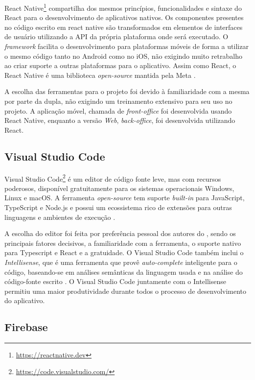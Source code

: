 React Native\footnote{\url{https://reactnative.dev}} compartilha dos mesmos princípios, funcionalidades e sintaxe do React para o desenvolvimento de aplicativos nativos. Os componentes presentes no código escrito em react native são transformados em elementos de interfaces de usuário utilizando a API da própria plataforma onde será executado. O \textit{framework} facilita o desenvolvimento para plataformas móveis de forma a utilizar o mesmo código tanto no Android como no iOS, não exigindo muito retrabalho ao criar suporte a outras plataformas para o aplicativo. Assim como React, o React Native é uma biblioteca \textit{open-source} mantida pela Meta \cite{react-native}.

A escolha das ferramentas para o projeto \appName foi devido à familiaridade com a mesma por parte da dupla, não exigindo um treinamento extensivo para seu uso no projeto. A aplicação móvel, chamada de \textit{front-office} foi desenvolvida usando React Native, enquanto a versão \textit{Web}, \textit{back-office}, foi desenvolvida utilizando React.

\subsection{Visual Studio Code}

Visual Studio Code\footnote{\url{https://code.visualstudio.com/}} é um editor de código fonte leve, mas com recursos poderosos, disponível gratuitamente para os sistemas operacionais Windows, Linux e macOS. A ferramenta \textit{open-source} tem suporte \textit{built-in} para JavaScript, TypeScript e Node.js e possui um ecossistema rico de extensões para outras linguagens e ambientes de execução \cite{vscode}.

A escolha do editor foi feita por preferência pessoal dos autores do \appName, sendo os principais fatores decisivos, a familiaridade com a ferramenta, o suporte nativo para Typescript e React e a gratuidade. O Visual Studio Code também inclui o \textit{Intellisense}, que é uma ferramenta que provê \textit{auto-complete} inteligente para o código, baseando-se em análises semânticas da linguagem usada e na análise do código-fonte escrito \cite{intellisense}. O Visual Studio Code juntamente com o Intellisense permitiu uma maior produtividade durante todos o processo de desenvolvimento do aplicativo.

\subsection{Firebase}

